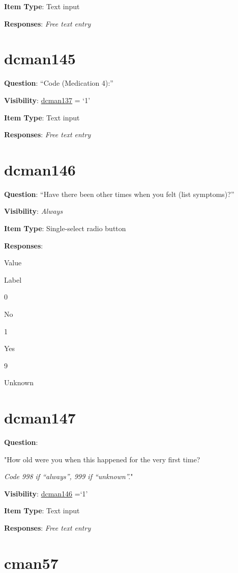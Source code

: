 \documentclass[]{book}
\begin{document}
\textbf{Item Type}: Text input

\textbf{Responses}: \emph{Free text entry}

\hypertarget{dcman145}{%
\section{dcman145}\label{dcman145}}

\textbf{Question}: ``Code (Medication 4):''

\textbf{Visibility}: \protect\hyperlink{dcman137}{dcman137} = `1'

\textbf{Item Type}: Text input

\textbf{Responses}: \emph{Free text entry}

\hypertarget{dcman146}{%
\section{dcman146}\label{dcman146}}

\textbf{Question}: ``Have there been other times when you felt (list symptoms)?''

\textbf{Visibility}: \emph{Always}

\textbf{Item Type}: Single-select radio button

\textbf{Responses}:

Value

Label

0

No

1

Yes

9

Unknown

\hypertarget{dcman147}{%
\section{dcman147}\label{dcman147}}

\textbf{Question}:

"How old were you when this happened for the very first time?

\emph{Code 998 if ``always'', 999 if ``unknown''.}"

\textbf{Visibility}: \protect\hyperlink{dcman146}{dcman146} =`1'

\textbf{Item Type}: Text input

\textbf{Responses}: \emph{Free text entry}

\hypertarget{cman57}{%
\section{cman57}\label{cman57}}
\end{document}
